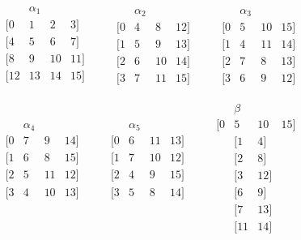 \[
\begin{matrix}
& \alpha_1 &&\\
  [0 & 1 & 2 & 3]\\
  [4 & 5 & 6 & 7]\\
  [8 & 9 & 10 & 11]\\
  [12 & 13 & 14 & 15]\\
\end{matrix}
\qquad
\begin{matrix}
& \alpha_2 &&\\
  [0 &   4 &   8 & 12]\\
  [1 &   5 &   9 & 13]\\
  [2 &   6 & 10 & 14]\\
  [3 &   7 & 11 & 15]
\end{matrix}
\qquad
\begin{matrix}
& \alpha_3 &&\\
  [0 &   5 &  10 & 15]\\
  [1 &   4 &  11 & 14]\\
  [2 &   7 & 8 & 13]\\
  [3 &   6 & 9 & 12]
\end{matrix}
\]

\vskip5mm

\[
\begin{matrix}
& \alpha_4 &&\\
  [0 &   7 & 9 & 14]\\
  [1 &   6 & 8 & 15]\\
  [2 &   5 & 11 & 12]\\
  [3 &   4 & 10 & 13]\\
&&&\\
&&&\\
&&&
\end{matrix}
\qquad
\begin{matrix}
& \alpha_5 &&\\
  [0 &   6 & 11 & 13]\\
  [1 &   7 & 10 & 12]\\
  [2 &   4 & 9 & 15]\\
  [3 &   5 & 8 & 14]\\
&&&\\
&&&\\
&&&
\end{matrix}
\qquad
\begin{matrix}
& \beta &&\\
  [0 &   5 &  10 & 15]\\
&  [1 &   4] & \\
&  [2 & 8] &\\
&  [3 &   12] & \\
& [6 & 9] & \\
&  [7 & 13] &\\
& [11 & 14] & 
\end{matrix}
\]

